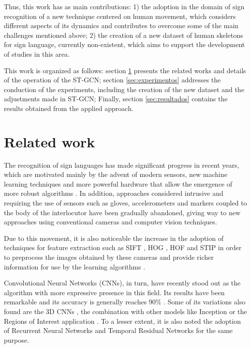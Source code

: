 Thus, this work has as main contributions: 1) the adoption in the domain of sign recognition of a new technique centered on human movement, which considers different aspects of its dynamics and contributes to overcome some of the main challenges mentioned above; 2) the creation of a new dataset of human skeletons for sign language, currently non-existent, which aims to support the development of studies in this area.

This work is organized as follows: section  \ref{sec:trabalhos-relacionados} presents the related works and details of the operation of the ST-GCN; section \ref{sec:experimentos} addresses the conduction of the experiments, including the creation of the new dataset and the adjustments made in ST-GCN; Finally, section \ref{sec:resultados} contains the results obtained from the applied approach.


\section{Related work}
\label{sec:trabalhos-relacionados}

The recognition of sign languages has made significant progress in recent years, which are motivated mainly by the advent of modern sensors, new machine learning techniques and more powerful hardware that allow the emergence of more robust algorithms \cite{recent-advances-dl-2017, recent-advances-sl-2013}. In addition, approaches considered intrusive and requiring the use of sensors such as gloves, accelerometers and markers coupled to the body of the interlocutor have been gradually abandoned, giving way to new approaches using conventional cameras and computer vision techniques.

Due to this movement, it is also noticeable the increase in the adoption of techniques for feature extraction such as SIFT \cite{lowe-2004}, HOG \cite{dalal-2005}, HOF \cite{laptev-2008} and STIP \cite{laptev-2008} in order to preprocess the images obtained by these cameras and provide richer information for use by the learning algorithms \cite{lim-2016, shanta-2018}.

Convolutional Neural Networks (CNNs), in turn, have recently stood out as the algorithm with more expressive presence in this field. Its results have been remarkable and its accuracy is generally reaches 90\% \cite{shanta-2018, ji-2017, taskiran-2018, rao-2018}. Some of its variations also found are the 3D CNNs \cite{elbadawy-2017}, the combination with other models like Inception \cite{das-2018} or the Regions of Interest application \cite{sajanraj-2018}. To a lesser extent, it is also noted the adoption of Recurrent Neural Networks \cite{konstantinidis-2018} and Temporal Residual Networks \cite{pigou-2017} for the same purpose.

